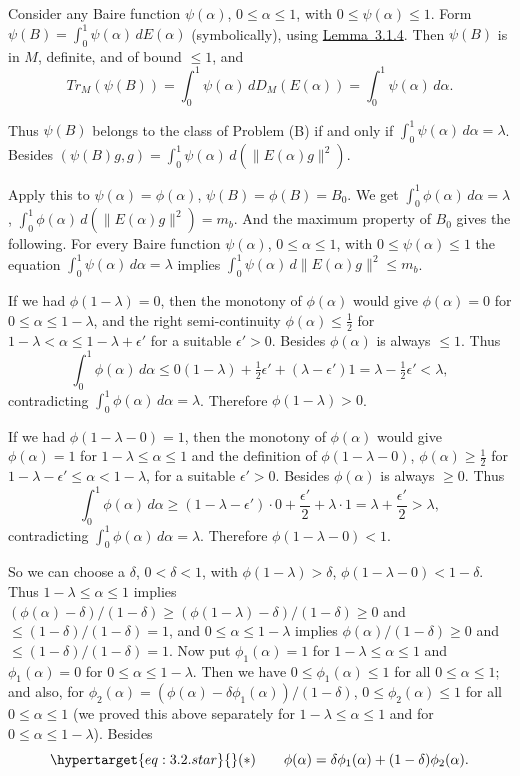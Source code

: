 \documentclass[twoside,leqno]{article}
\newcommand{\TrM}{Tr_M}
\newcommand{\StatementRef}[2]{\hyperlink{stmt:#1}{#2}}
\newcommand{\EquationTarget}[1]{\hypertarget{eq:#1}{}}
\begin{document}
Consider any Baire function $\psi(\alpha)$, $0\leq\alpha\leq1$, with
$0\leq\psi(\alpha)\leq1$. Form
$\psi(B)=\int_0^1\psi(\alpha)\,dE(\alpha)$ (symbolically),
using \StatementRef{lemma:3.1.4}{Lemma~3.1.4}. Then $\psi(B)$ is in $M$,
definite, and of bound $\leq1$, and
\[
 \TrM(\psi(B))
 =\int_0^1\psi(\alpha)\,dD_M(E(\alpha))
 =\int_0^1\psi(\alpha)\,d\alpha.
\]

Thus $\psi(B)$ belongs to the class of Problem (B) if and only if
$\int_0^1\psi(\alpha)\,d\alpha=\lambda$. Besides
$(\psi(B)g,g)=\int_0^1\psi(\alpha)\,d(\lVert E(\alpha)g\rVert^2)$.

Apply this to $\psi(\alpha)=\phi(\alpha)$,
$\psi(B)=\phi(B)=B_0$. We get
$\int_0^1\phi(\alpha)\,d\alpha=\lambda$,
$\int_0^1\phi(\alpha)\,d(\lVert E(\alpha)g\rVert^2)=m_b$.
And the maximum property of $B_0$ gives the following. For every Baire
function $\psi(\alpha)$, $0\leq\alpha\leq1$, with
$0\leq\psi(\alpha)\leq1$ the equation
$\int_0^1\psi(\alpha)\,d\alpha=\lambda$ implies
$\int_0^1\psi(\alpha)\,d\lVert E(\alpha)g\rVert^2\leq m_b$.

If we had $\phi(1-\lambda)=0$, then the monotony of $\phi(\alpha)$ would
give $\phi(\alpha)=0$ for $0\leq\alpha\leq1-\lambda$, and the right
semi-continuity $\phi(\alpha)\leq\tfrac12$ for
$1-\lambda<\alpha\leq1-\lambda+\epsilon'$ for a suitable $\epsilon'>0$.
Besides $\phi(\alpha)$ is always $\leq1$. Thus
\[
 \int_0^1\phi(\alpha)\,d\alpha
 \leq0(1-\lambda)+\tfrac12\epsilon'+(\lambda-\epsilon')1
 =\lambda-\tfrac12\epsilon'<\lambda,
\]
contradicting $\int_0^1\phi(\alpha)\,d\alpha=\lambda$. Therefore
$\phi(1-\lambda)>0$.

If we had $\phi(1-\lambda-0)=1$, then the monotony of $\phi(\alpha)$ would
give $\phi(\alpha)=1$ for $1-\lambda\leq\alpha\leq1$ and the definition of
$\phi(1-\lambda-0)$, $\phi(\alpha)\geq\tfrac12$ for
$1-\lambda-\epsilon'\leq\alpha<1-\lambda$, for a suitable $\epsilon'>0$.
Besides $\phi(\alpha)$ is always $\geq0$. Thus
\[
 \int_0^1\phi(\alpha)\,d\alpha
 \geq(1-\lambda-\epsilon')\cdot0+\frac{\epsilon'}2+\lambda\cdot1
 =\lambda+\frac{\epsilon'}2>\lambda,
\]
contradicting $\int_0^1\phi(\alpha)\,d\alpha=\lambda$. Therefore
$\phi(1-\lambda-0)<1$.

So we can choose a $\delta$, $0<\delta<1$, with
$\phi(1-\lambda)>\delta$, $\phi(1-\lambda-0)<1-\delta$.
Thus $1-\lambda\leq\alpha\leq1$ implies
$(\phi(\alpha)-\delta)/(1-\delta)
\geq(\phi(1-\lambda)-\delta)/(1-\delta)\geq0$ and
$\leq(1-\delta)/(1-\delta)=1$,
and $0\leq\alpha\leq1-\lambda$ implies
$\phi(\alpha)/(1-\delta)\geq0$ and $\leq(1-\delta)/(1-\delta)=1$.
Now put $\phi_1(\alpha)=1$ for $1-\lambda\leq\alpha\leq1$ and
$\phi_1(\alpha)=0$ for $0\leq\alpha\leq1-\lambda$. Then we have
$0\leq\phi_1(\alpha)\leq1$ for all $0\leq\alpha\leq1$; and also, for
$\phi_2(\alpha)=(\phi(\alpha)-\delta\phi_1(\alpha))/(1-\delta)$,
$0\leq\phi_2(\alpha)\leq1$ for all $0\leq\alpha\leq1$ (we proved this
above separately for $1-\lambda\leq\alpha\leq1$ and for
$0\leq\alpha\leq1-\lambda$). Besides
\[
 \EquationTarget{3.2.star}(*)\qquad
 \phi(\alpha)=\delta\phi_1(\alpha)+(1-\delta)\phi_2(\alpha).
\]
\end{document}
